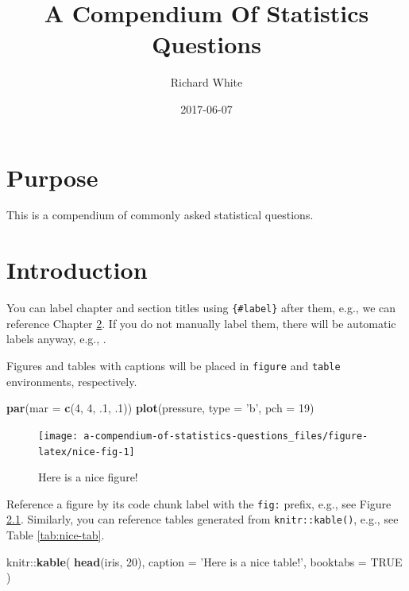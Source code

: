 \documentclass[]{book}
\title{A Compendium Of Statistics Questions}
\author{Richard White}
\date{2017-06-07}
\newenvironment{Shaded}{\begin{snugshade}}{\end{snugshade}}
\newcommand{\KeywordTok}[1]{\textcolor[rgb]{0.13,0.29,0.53}{\textbf{{#1}}}}
\newcommand{\DataTypeTok}[1]{\textcolor[rgb]{0.13,0.29,0.53}{{#1}}}
\newcommand{\DecValTok}[1]{\textcolor[rgb]{0.00,0.00,0.81}{{#1}}}
\newcommand{\StringTok}[1]{\textcolor[rgb]{0.31,0.60,0.02}{{#1}}}
\newcommand{\OtherTok}[1]{\textcolor[rgb]{0.56,0.35,0.01}{{#1}}}
\newcommand{\NormalTok}[1]{{#1}}
\theoremstyle{definition}
\theoremstyle{definition}
\theoremstyle{remark}
\begin{document}
\maketitle

{
\setcounter{tocdepth}{1}
\tableofcontents
}
\chapter{Purpose}\label{purpose}

This is a compendium of commonly asked statistical questions.

\chapter{Introduction}\label{intro}

You can label chapter and section titles using \texttt{\{\#label\}}
after them, e.g., we can reference Chapter \ref{intro}. If you do not
manually label them, there will be automatic labels anyway, e.g., .

Figures and tables with captions will be placed in \texttt{figure} and
\texttt{table} environments, respectively.

\begin{Shaded}
\begin{Highlighting}[]
\KeywordTok{par}\NormalTok{(}\DataTypeTok{mar =} \KeywordTok{c}\NormalTok{(}\DecValTok{4}\NormalTok{, }\DecValTok{4}\NormalTok{, .}\DecValTok{1}\NormalTok{, .}\DecValTok{1}\NormalTok{))}
\KeywordTok{plot}\NormalTok{(pressure, }\DataTypeTok{type =} \StringTok{'b'}\NormalTok{, }\DataTypeTok{pch =} \DecValTok{19}\NormalTok{)}
\end{Highlighting}
\end{Shaded}

\begin{figure}

{\centering \texttt{[image: a-compendium-of-statistics-questions\_files/figure-latex/nice-fig-1]} 

}

\caption{Here is a nice figure!}\label{fig:nice-fig}
\end{figure}

Reference a figure by its code chunk label with the \texttt{fig:}
prefix, e.g., see Figure \ref{fig:nice-fig}. Similarly, you can
reference tables generated from \texttt{knitr::kable()}, e.g., see Table
\ref{tab:nice-tab}.

\begin{Shaded}
\begin{Highlighting}[]
\NormalTok{knitr::}\KeywordTok{kable}\NormalTok{(}
  \KeywordTok{head}\NormalTok{(iris, }\DecValTok{20}\NormalTok{), }\DataTypeTok{caption =} \StringTok{'Here is a nice table!'}\NormalTok{,}
  \DataTypeTok{booktabs =} \OtherTok{TRUE}
\NormalTok{)}
\end{Highlighting}
\end{Shaded}
\end{document}
